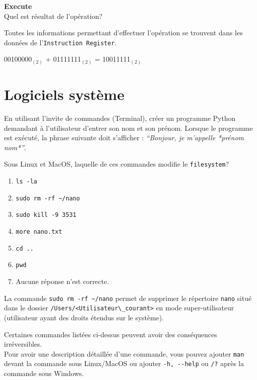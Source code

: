 \begin{Exercice}[5 minutes] \textbf{Execute}\\
    Quel est résultat de l'opération?
\end{Exercice}

   \begin{conseil}
        Toutes les informations permettant d’effectuer l’opération se trouvent dans les données de l’\lstinline{Instruction Register}.
    \end{conseil}

\begin{solution}
    00100000$_{(2)}$ + 01111111$_{(2)}$ = 10011111$_{(2)}$
\end{solution}


\section{Logiciels système}

\begin{Exercice}[10 minutes]
    En utilisant l’invite de commandes (Terminal), créer un programme Python demandant à l’utilisateur d’entrer son nom et son prénom. Lorsque le programme est exécuté, la phrase suivante doit s’afficher : \textit{``Bonjour, je m’appelle *prénom nom*''}.
\end{Exercice}

\begin{solution}
    
\end{solution}


\begin{Exercice}[5 minutes]
    Sous Linux et MacOS, laquelle de ces commandes modifie le \lstinline{filesystem}?
    \begin{enumerate}
        \item \lstinline{ls -la}
        \item \lstinline{sudo rm -rf ~/nano}
        \item \lstinline{sudo kill -9 3531}
        \item \lstinline{more nano.txt}
        \item \lstinline{cd ..}
        \item \lstinline{pwd}
        \item Aucune réponse n'est correcte.
    \end{enumerate}
    \begin{solution}
        La commande \lstinline{sudo rm -rf ~/nano} permet de supprimer le répertoire \lstinline{nano} situé dans le dossier \lstinline{/Users/<Utilisateur\_courant>} en mode super-utilisateur (utilisateur ayant des droits étendus sur le système).
    \end{solution}
    \begin{attention}
        Certaines commandes listées ci-dessus peuvent avoir des conséquences irréversibles.\\
        Pour avoir une description détaillée d'une commande, vous pouvez ajouter \lstinline{man} devant la commande sous Linux/MacOS ou ajouter \lstinline{-h, --help} ou \lstinline{/?} après la commande sous Windows.
    \end{attention}
\end{Exercice}

